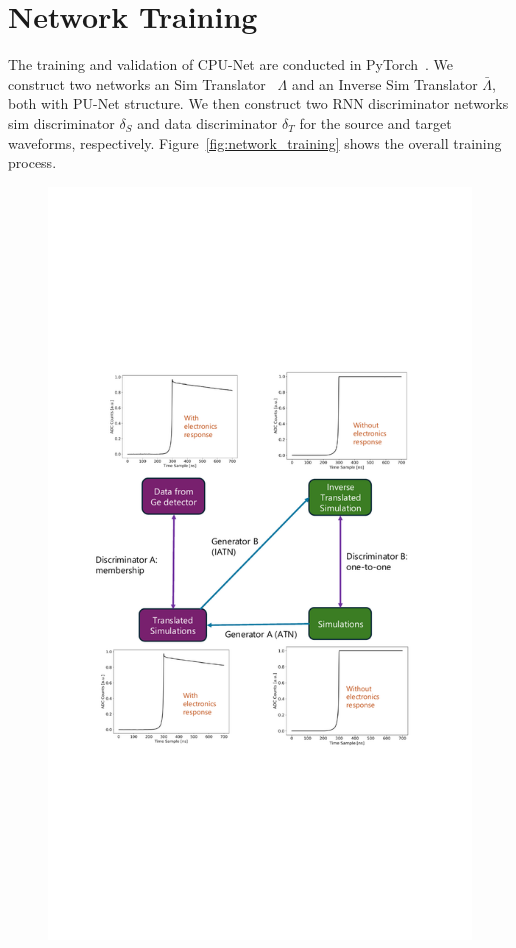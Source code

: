 \section{Network Training}

The training and validation of CPU-Net are conducted in PyTorch~\cite{pytorch}. We construct two networks an Sim Translator~ $\Lambda$ and an Inverse Sim Translator $\bar{\Lambda}$, both with PU-Net structure. We then construct two RNN discriminator networks sim discriminator $\delta_{S}$ and data discriminator $\delta_{T}$ for the source and target waveforms, respectively. Figure~\ref{fig:network_training} shows the overall training process.
\clearpage
\begin{figure}[htb!]
    \includegraphics[width=0.99\linewidth,trim={5pc 20pc 6.5pc 19pc},clip]{ch7/figs/cycle_gan_training.pdf}

\end{figure}
